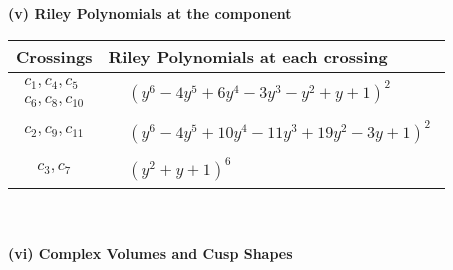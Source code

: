 \documentclass[1p]{elsarticle_modified}
\theoremstyle{definition}
\begin{document}
\flushleft \textbf{(v) Riley Polynomials at the component}\newline \\
\begin{tabular}{m{50pt}|m{274pt}}
Crossings & \hspace{64pt}Riley Polynomials at each crossing \\
\hline $$\begin{aligned}c_{1},c_{4},c_{5}\\c_{6},c_{8},c_{10}\end{aligned}$$&$\begin{aligned}
&(y^6-4 y^5+6 y^4-3 y^3- y^2+y+1)^2
\end{aligned}$\\
\hline $$\begin{aligned}c_{2},c_{9},c_{11}\end{aligned}$$&$\begin{aligned}
&(y^6-4 y^5+10 y^4-11 y^3+19 y^2-3 y+1)^2
\end{aligned}$\\
\hline $$\begin{aligned}c_{3},c_{7}\end{aligned}$$&$\begin{aligned}
&(y^2+y+1)^6
\end{aligned}$\\
\hline
\end{tabular}\\~\\
\newpage\flushleft \textbf{(vi) Complex Volumes and Cusp Shapes}
\end{document}
